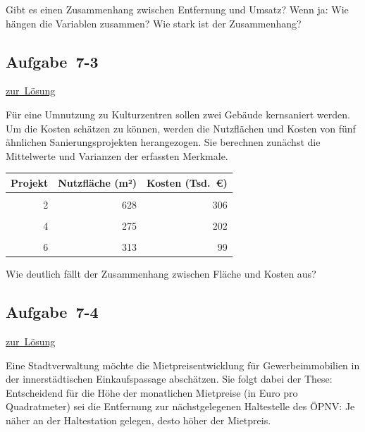 \documentclass[
  11pt,
  ngerman,
  a4paper,
]{report}
\begin{document}
Gibt es einen Zusammenhang zwischen Entfernung und Umsatz?
Wenn ja: Wie hängen die Variablen zusammen? Wie stark ist der Zusammenhang?

\hypertarget{aufgabe-7-3}{%
\subsection{Aufgabe~7-3}\label{aufgabe-7-3}}

\protect\hyperlink{loesung-7-3}{zur~Lösung}

Für eine Umnutzung zu Kulturzentren sollen zwei Gebäude kernsaniert werden. Um die Kosten schätzen zu können, werden die Nutzflächen und Kosten von fünf ähnlichen Sanierungsprojekten herangezogen. Sie berechnen zunächst die Mittelwerte und Varianzen der erfassten Merkmale.

\begin{table}
\centering
\begin{tabular}{rrr}
\toprule
\textbf{Projekt} & \textbf{Nutzfläche (m²)} & \textbf{Kosten (Tsd. €)}\\
\midrule
\cellcolor{gray!6}{1} & \cellcolor{gray!6}{456} & \cellcolor{gray!6}{264}\\
2 & 628 & 306\\
\cellcolor{gray!6}{3} & \cellcolor{gray!6}{497} & \cellcolor{gray!6}{348}\\
4 & 275 & 202\\
\cellcolor{gray!6}{5} & \cellcolor{gray!6}{549} & \cellcolor{gray!6}{322}\\
6 & 313 & 99\\
\bottomrule
\end{tabular}
\end{table}

Wie deutlich fällt der Zusammenhang zwischen Fläche und Kosten aus?

\hypertarget{aufgabe-7-4}{%
\subsection{Aufgabe~7-4}\label{aufgabe-7-4}}

\protect\hyperlink{loesung-7-4}{zur~Lösung}

Eine Stadtverwaltung möchte die Mietpreisentwicklung für Gewerbeimmobilien in der innerstädtischen Einkaufspassage abschätzen. Sie folgt dabei der These: Entscheidend für die Höhe der monatlichen Mietpreise (in Euro pro Quadratmeter) sei die Entfernung zur nächstgelegenen Haltestelle des ÖPNV: Je näher an der Haltestation gelegen, desto höher der Mietpreis.
\end{document}
